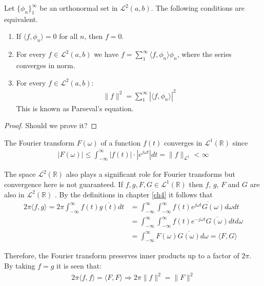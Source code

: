 \begin{theorem}
Let $\{\phi_n\}_1^\infty$ be an orthonormal set in $\mathcal{L}^2(a,b)$. The following conditions are equivalent.
\begin{enumerate}[label=(\alph*)]
\item If $\langle f, \phi_n \rangle = 0$ for all $n$, then $f = 0$.
\item For every $f \in \mathcal{L}^2(a,b)$ we have $f = \sum_1^\infty \langle f, \phi_n \rangle \phi_n$, where the series converges in norm.\\
\item For every $f \in \mathcal{L}^2(a,b)$:
\begin{align*}
\|f\|^2 = \sum_1^\infty |\langle f,\phi_n \rangle|^2
\end{align*}
This is known as Parseval's equation.
\end{enumerate}
\end{theorem}

\begin{proof}
Should we prove it?
\end{proof}

The Fourier transform $F(\omega)$ of a function $f(t)$ converges in $\mathcal{L}^1(\mathbb{R})$ since
\begin{align*}
|F(\omega)| \leq \int_{-\infty}^\infty |f(t)| \cdot |e^{j \omega t}| dt = \|f\|_{\mathcal{L}^1} < \infty
\end{align*}

\noindent
The space $\mathcal{L}^2(\mathbb{R})$ also plays a significant role for Fourier transforms but convergence here is not guaranteed. If $f, g, F, G \in \mathcal{L}^1(\mathbb{R})$ then $f$, $g$, $F$ and $G$ are also in $\mathcal{L}^2(\mathbb{R})$ \cite{page 219, FAA}. By the definitions in chapter \ref{ch4} it follows that
\begin{align*}
2\pi \langle f,g \rangle = 2\pi \int_{-\infty}^\infty f(t) \overline{g(t)} dt &= \int_{-\infty}^\infty \int_{-\infty}^\infty f(t) \overline{e^{j\omega t} G(\omega)} d\omega dt \\
&= \int_{-\infty}^\infty \int_{-\infty}^\infty f(t) e^{-j\omega t} \overline{G(\omega)} dt d\omega \\
&= \int_{-\infty}^\infty F(\omega) \overline{G(\omega)} d\omega = \langle F,G \rangle
\end{align*}

Therefore, the Fourier transform preserves inner products up to a factor of $2\pi$. By taking $f = g$ it is seen that:
\begin{align*}
2\pi \langle f,f \rangle = \langle F,F \rangle \Rightarrow 2\pi \|f\|^2 = \|F\|^2
\end{align*}

